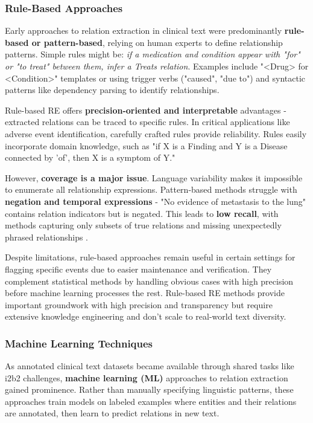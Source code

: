 \subsubsection{Rule-Based Approaches}

Early approaches to relation extraction in clinical text were predominantly \textbf{rule-based or pattern-based}, relying on human experts to define relationship patterns. Simple rules might be: \emph{if a medication and condition appear with "for" or "to treat" between them, infer a Treats relation}. Examples include "<Drug> for <Condition>" templates or using trigger verbs ("caused", "due to") and syntactic patterns like dependency parsing to identify relationships.

Rule-based RE offers \textbf{precision-oriented and interpretable} advantages - extracted relations can be traced to specific rules. In critical applications like adverse event identification, carefully crafted rules provide reliability. Rules easily incorporate domain knowledge, such as "if X is a Finding and Y is a Disease connected by 'of', then X is a symptom of Y."

However, \textbf{coverage is a major issue}. Language variability makes it impossible to enumerate all relationship expressions. Pattern-based methods struggle with \textbf{negation and temporal expressions} - "No evidence of metastasis to the lung" contains relation indicators but is negated. This leads to \textbf{low recall}, with methods capturing only subsets of true relations and missing unexpectedly phrased relationships \parencite{Laue2024}.

Despite limitations, rule-based approaches remain useful in certain settings for flagging specific events due to easier maintenance and verification. They complement statistical methods by handling obvious cases with high precision before machine learning processes the rest. Rule-based RE methods provide important groundwork with high precision and transparency but require extensive knowledge engineering and don't scale to real-world text diversity.
\subsubsection{Machine Learning Techniques}

As annotated clinical text datasets became available through shared tasks like i2b2 challenges, \textbf{machine learning (ML)} approaches to relation extraction gained prominence. Rather than manually specifying linguistic patterns, these approaches train models on labeled examples where entities and their relations are annotated, then learn to predict relations in new text.

